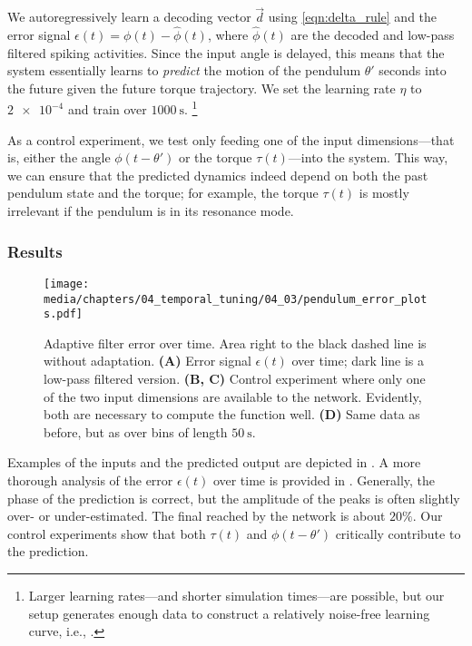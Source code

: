 We autoregressively learn a decoding vector $\vec d$ using \cref{eqn:delta_rule} and the error signal $\epsilon(t) = \phi(t) - \hat \phi(t)$, where $\hat \phi(t)$ are the decoded and low-pass filtered spiking activities.
Since the input angle is delayed, this means that the system essentially learns to \emph{predict} the motion of the pendulum $\theta'$ seconds into the future given the future torque trajectory.
We set the learning rate $\eta$ to $\num{2e-4}$ and train over $\SI{1000}{\second}$.%
\footnote{Larger learning rates---and shorter simulation times---are possible, but our setup generates enough data to construct a relatively noise-free learning curve, i.e., .}

As a control experiment, we test only feeding one of the input dimensions---that is, either the angle $\phi(t - \theta')$ or the torque $\tau(t)$---into the system.
This way, we can ensure that the predicted dynamics indeed depend on both the past pendulum state and the torque; for example, the torque $\tau(t)$ is mostly irrelevant if the pendulum is in its resonance mode.

\subsubsection{Results}

\begin{figure}
	\centering
	\texttt{[image: media/chapters/04\_temporal\_tuning/04\_03/pendulum\_error\_plots.pdf]}
	\caption[Adaptive filter error over time]{
		Adaptive filter error over time.
		Area right to the black dashed line is without adaptation.
		\textbf{(A)} Error signal $\epsilon(t)$ over time; dark line is a low-pass filtered version.
		\textbf{(B, C)} Control experiment where only one of the two input dimensions are available to the network.
		Evidently, both are necessary to compute the function well.
		\textbf{(D)} Same data as before, but as \NRMSE over bins of length $\SI{50}{\second}$.
	}
	\label{fig:pendulum_error_plots}
\end{figure}

Examples of the inputs and the predicted output are depicted in .
A more thorough analysis of the error $\epsilon(t)$ over time is provided in .
Generally, the phase of the prediction is correct, but the amplitude of the peaks is often slightly over- or under-estimated.
The final \NRMSE reached by the network is about $20\%$.
Our control experiments show that both $\tau(t)$ and $\phi(t - \theta')$ critically contribute to the prediction.

